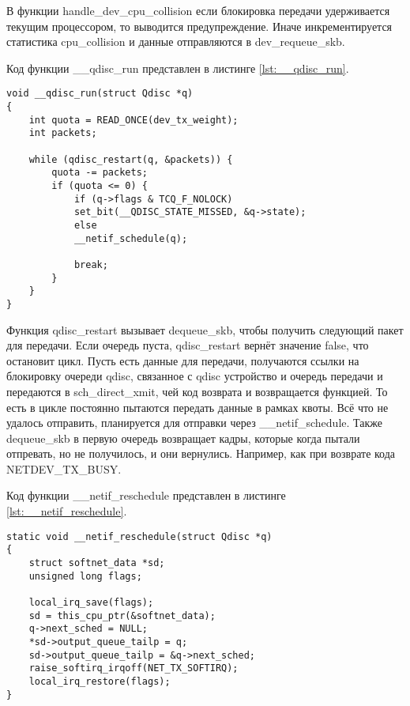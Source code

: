 В функции handle\_dev\_cpu\_collision если блокировка передачи удерживается текущим процессором, то выводится предупреждение. Иначе инкрементируется статистика cpu\_collision и данные отправляются в dev\_requeue\_skb.

Код функции \_\_qdisc\_run представлен в листинге \ref{lst:__qdisc_run}.
\begin{center}
	\captionsetup{justification=raggedright,singlelinecheck=off}
	\begin{lstlisting}[label=lst:__qdisc_run,caption=Функция \_\_qdisc\_run,showstringspaces=false]
void __qdisc_run(struct Qdisc *q)
{
	int quota = READ_ONCE(dev_tx_weight);
	int packets;
	
	while (qdisc_restart(q, &packets)) {
		quota -= packets;
		if (quota <= 0) {
			if (q->flags & TCQ_F_NOLOCK)
			set_bit(__QDISC_STATE_MISSED, &q->state);
			else
			__netif_schedule(q);
			
			break;
		}
	}
}
	\end{lstlisting}
\end{center}
\FloatBarrier

Функция qdisc\_restart вызывает dequeue\_skb, чтобы получить следующий пакет для передачи. Если очередь пуста, qdisc\_restart вернёт значение false, что остановит цикл. Пусть есть данные для передачи, получаются ссылки на блокировку очереди qdisc, связанное с qdisc устройство и очередь передачи и передаются в sch\_direct\_xmit, чей код возврата и возвращается функцией. То есть в цикле постоянно пытаются передать данные в рамках квоты. Всё что не удалось отправить, планируется для отправки через \_\_netif\_schedule. Также dequeue\_skb в первую очередь возвращает кадры, которые когда пытали отпревать, но не получилось, и они вернулись. Например, как при возврате кода NETDEV\_TX\_BUSY.

Код функции \_\_netif\_reschedule представлен в листинге \ref{lst:__netif_reschedule}.
\begin{center}
	\captionsetup{justification=raggedright,singlelinecheck=off}
	\begin{lstlisting}[label=lst:__netif_reschedule,caption=Функция \_\_netif\_reschedule,showstringspaces=false]
static void __netif_reschedule(struct Qdisc *q)
{
	struct softnet_data *sd;
	unsigned long flags;
	
	local_irq_save(flags);
	sd = this_cpu_ptr(&softnet_data);
	q->next_sched = NULL;
	*sd->output_queue_tailp = q;
	sd->output_queue_tailp = &q->next_sched;
	raise_softirq_irqoff(NET_TX_SOFTIRQ);
	local_irq_restore(flags);
}
	\end{lstlisting}
\end{center}
\FloatBarrier

